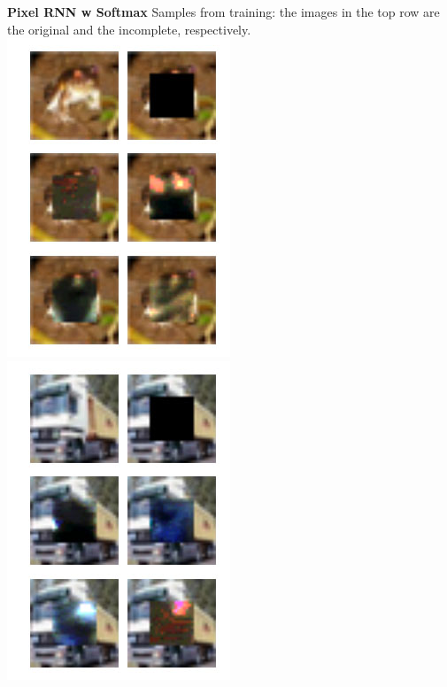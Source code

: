 \documentclass[10pt,twocolumn,letterpaper]{article}
\begin{document}
\textbf{Pixel RNN w Softmax}
Samples from training: the images in the top row are the original and the incomplete, respectively. \\
\includegraphics[width=0.8\linewidth]{rnn_rgb_train_frog.jpg} 
\includegraphics[width=0.8\linewidth]{rnn_rgb_train_truck.jpg} 
\end{document}
